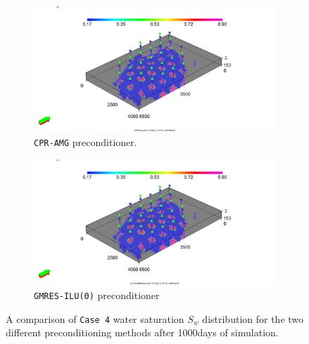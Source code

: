 \begin{figure}
\centering
\begin{subfigure}{.5\textwidth}
  \centering
  \includegraphics[width=1.3\linewidth]{figures/Case8_CPR_Sw.png}
  \caption{\texttt{CPR-AMG} preconditioner.}
\end{subfigure}%
\begin{subfigure}{.5\textwidth}
  \centering
  \includegraphics[width=1.3\linewidth]{figures/Case8_ILU-GMRES_Sw.png}
  \caption{\texttt{GMRES-ILU(0)} preconditioner}
\end{subfigure}
\caption{A comparison of \texttt{Case 4} water saturation $S_{w}$ distribution for the two different preconditioning methods after 1000days of simulation.}
\label{case8sw}
\end{figure}


